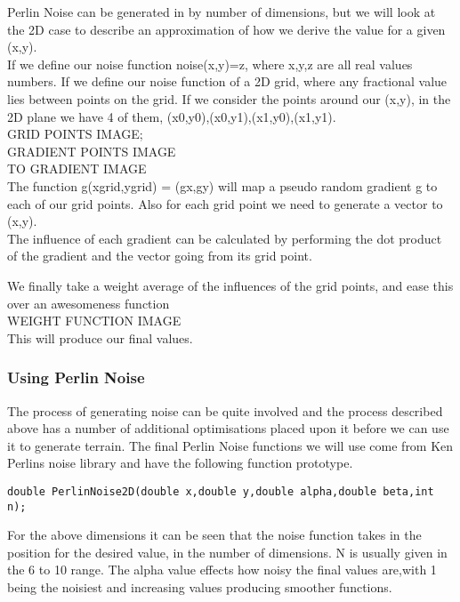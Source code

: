 Perlin Noise can be generated in by number of dimensions, but we will look at the
2D case to describe an approximation of how we derive the value for a given 
(x,y).\\

If we define our noise function noise(x,y)=z, where x,y,z are all real values
numbers. If we define our noise function of a 2D grid, where any fractional value
lies between points on the grid. If we consider the points around our (x,y), in
the 2D plane we have 4 of them, (x0,y0),(x0,y1),(x1,y0),(x1,y1).\\

GRID POINTS IMAGE;\\
GRADIENT POINTS IMAGE\\
TO GRADIENT IMAGE\\

The function g(xgrid,ygrid) = (gx,gy) will map a pseudo random gradient g to each
of our grid points. Also for each grid point we need to generate a vector to 
(x,y).\\

The influence of each gradient can be calculated by performing the dot product of
the gradient and the vector going from its grid point.

We finally take a weight average of the influences of the grid points, and ease
this over an awesomeness function\\

WEIGHT FUNCTION IMAGE\\

This will produce our final values.\\

\subsubsection*{Using Perlin Noise}
The process of generating noise can be quite involved and the process described
above has a number of additional optimisations placed upon it before we can use
it to generate terrain. The final Perlin Noise functions we will use come from
Ken Perlins noise library and have the following function prototype.\\

\begin{lstlisting}
double PerlinNoise2D(double x,double y,double alpha,double beta,int n);
\end{lstlisting}

For the above dimensions it can be seen that the noise function takes in the 
position for the desired value, in the number of dimensions. N is usually given
in the 6 to 10 range. The alpha value effects how noisy the final values are,with
1 being the noisiest and increasing values producing smoother functions.\\

